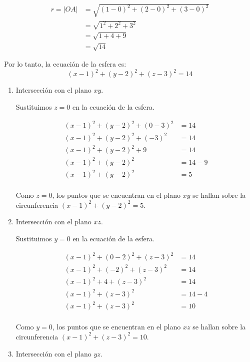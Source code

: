 \documentclass[12pt]{article}
\begin{document}
\begin{align*}
  r = |OA|
  &= \sqrt{(1-0)^2 + (2-0)^2 + (3-0)^2} \\
  &= \sqrt{1^2 + 2^2 + 3^2} \\
  &= \sqrt{1 + 4 + 9} \\
  &= \sqrt{14}
\end{align*}

Por lo tanto, la ecuación de la esfera es: $$ (x-1)^2 + (y-2)^2 + (z-3)^2 = 14 $$

\begin{enumerate}[format=\textbf]
  
\item Intersección con el plano $xy$.
  
  Sustituimos $z = 0$ en la ecuación de la esfera.
  
  \begin{align*}
    (x-1)^2 + (y-2)^2 + (0-3)^2
    &= 14 \\
    (x-1)^2 + (y-2)^2 + (-3)^2
    &= 14 \\
    (x-1)^2 + (y-2)^2 + 9
    &= 14 \\
    (x-1)^2 + (y-2)^2
    &= 14 - 9 \\
    (x-1)^2 + (y-2)^2
    &= 5 \\
  \end{align*}
  
  Como $z = 0$, los puntos que se encuentran en el plano $xy$ se hallan sobre la circunferencia $(x-1)^2 + (y-2)^2 = 5$.
  
\item Intersección con el plano $xz$.
  
  Sustituimos $y = 0$ en la ecuación de la esfera.
  
  \begin{align*}
    (x-1)^2 + (0-2)^2 + (z-3)^2
    &= 14 \\
    (x-1)^2 + (-2)^2 + (z-3)^2
    &= 14 \\
    (x-1)^2 + 4 + (z-3)^2
    &= 14 \\
    (x-1)^2 + (z-3)^2
    &= 14 - 4 \\
    (x-1)^2 + (z-3)^2
    &= 10 \\
  \end{align*}
  
  Como $y = 0$, los puntos que se encuentran en el plano $xz$ se hallan sobre la circunferencia $(x-1)^2 + (z-3)^2 = 10$.
  
\item Intersección con el plano $yz$.
  

\end{enumerate}
\end{document}
